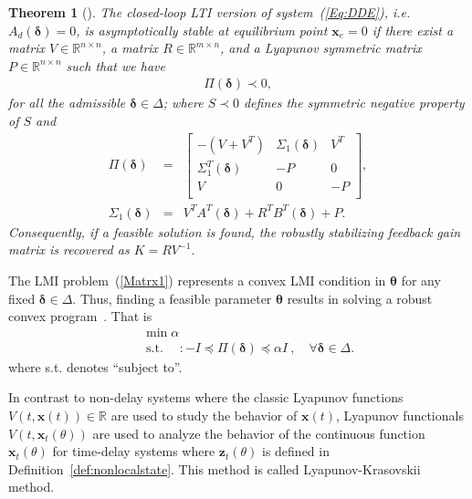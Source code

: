 \documentclass[journal]{IEEEtran}
\newtheorem{thm}{Theorem}
\def \st {\operatorname{s.t.}\quad }
\begin{document}
\begin{thm}[\cite{Calafiore2006scenario, Apkarian2001continuous}]\label{thm:lti}
	The closed-loop LTI version of system~(\ref{Eq:DDE}), i.e. $ A_d (\boldsymbol \delta)=0 $, is asymptotically stable at equilibrium point $ \mathbf x_e=0 $ if there exist a matrix $ V\in \mathbb{R}^{n\times n}$, a matrix $R \in \mathbb{R}^{m \times n}$, and a Lyapunov symmetric matrix $P \in \mathbb{R}^{n\times n} $ such that we have
	\begin{eqnarray}\label{Matrx1}
		\Pi(\boldsymbol\delta) \prec 0,
	\end{eqnarray}
	for all the admissible $ \boldsymbol\delta \in \Delta $; where $S \prec 0$ defines the symmetric negative property of $ S $ and
	\begin{eqnarray}\label{eq:PI} \nonumber
		\Pi(\boldsymbol\delta)&=&\begin{bmatrix}
			-(V+V^T)                         & \varSigma_1(\boldsymbol\delta) & V^T \\
			\varSigma_1^T(\boldsymbol\delta) & -P                             & 0   \\
			V                                & 0                              & -P  \\
		\end{bmatrix},
		\\
		\varSigma_1(\boldsymbol\delta)&=& V^TA^T(\boldsymbol\delta)+R^TB^T(\boldsymbol \delta) +P.
	\end{eqnarray}
	Consequently, if a feasible solution is found, the robustly stabilizing feedback gain matrix is recovered as $K=RV^{-1}$.
\end{thm}

The LMI problem~(\ref{Matrx1}) represents a convex LMI condition in $\boldsymbol\theta $ for any fixed $\boldsymbol\delta \in \Delta$. Thus, finding a feasible parameter $\boldsymbol\theta$ results in solving a robust convex program~\cite{Calafiore2006scenario}. That is
\begin{eqnarray}\label{key}
	&&\min \alpha \nonumber\\
	&&\st : 	-I \preceq \Pi(\boldsymbol{\delta}) \preceq \alpha I ~, \quad \forall {\boldsymbol{\delta}}\in \Delta.
\end{eqnarray}
where s.t. denotes ``subject to''.



In contrast to non-delay systems where the classic Lyapunov functions $ V(t,\mathbf x(t)) \in \mathbb R$ are used to study the behavior of $ \mathbf x(t) $, Lyapunov functionals $ V(t,\mathbf x_t(\theta) )$ are used to analyze the behavior of the continuous function $ \mathbf x_t(\theta) $ for time-delay systems where $ {\mathbf z}_t(\theta) $ is defined in Definition~\ref{def:nonlocalstate}. This method is called Lyapunov-Krasovskii method.
\end{document}
